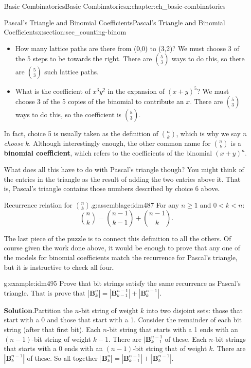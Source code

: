 \documentclass[oneside,10pt,]{book}
\newcommand{\terminology}[1]{\textbf{#1}}
\numberwithin{equation}{chapter}
\def\B{\mathbf{B}}
\newcommand{\lt}{<}
\begin{document}
\begin{chapterptx}{Basic Combinatorics}{}{Basic Combinatorics}{}{}{x:chapter:ch_basic-combinatorics}
\begin{sectionptx}{Pascal's Triangle and Binomial Coefficients}{}{Pascal's Triangle and Binomial Coefficients}{}{}{x:section:sec_counting-binom}
\begin{itemize}[label=\textbullet]
\item{}How many lattice paths are there from (0,0) to (3,2)?  We must choose 3 of the 5 steps to be towards the right.  There are \({5 \choose 3}\) ways to do this, so there are \({5 \choose 3}\) such lattice paths.%
\item{}What is the coefficient of \(x^3y^2\) in the expansion of \((x+y)^5\)?  We must choose 3 of the 5 copies of the binomial to contribute an \(x\).  There are \({5 \choose 3}\) ways to do this, so the coefficient is \({5 \choose 3}\).%
\end{itemize}
%
\par
In fact, choice 5 is usually taken as the definition of \(\binom{n}{k}\), which is why we say \(n\) \emph{choose} \(k\).  Although interestingly enough, the other common name for \(\binom{n}{k}\) is a \terminology{binomial coefficient}, which refers to the coefficients of the binomial \((x+y)^n\).%
\par
What does all this have to do with Pascal's triangle though?  You might think of the entries in the triangle as the result of adding the two entries above it.  That is, Pascal's triangle contains those numbers described by choice 6 above.%
\begin{assemblage}{Recurrence relation for \({n \choose k}\).}{g:assemblage:idm487}%
For any \(n \ge 1\) and \(0 \lt k \lt n\):%
\begin{equation*}
{n \choose k} = {n-1 \choose k-1} + {n-1 \choose k}.
\end{equation*}
%
\end{assemblage}
The last piece of the puzzle is to connect this definition to all the others.  Of course given the work done above, it would be enough to prove that any one of the models for binomial coefficients match the recurrence for Pascal's triangle, but it is instructive to check all four.%
\begin{example}{}{g:example:idm495}%
Prove that bit strings satisfy the same recurrence as Pascal's triangle.  That is prove that \(|\B^n_k| = |\B^{n-1}_{k-1}| + |\B^{n-1}_k|\).%
\par\smallskip%
\noindent\textbf{Solution}.\hypertarget{g:solution:idm499}{}\quad{}Partition the \(n\)-bit string of weight \(k\) into two disjoint sets: those that start with a 0 and those that start with a 1.  Consider the remainder of each bit string (after that first bit). Each \(n\)-bit string that starts with a 1 ends with an \((n-1)\)-bit string of weight \(k-1\).  There are \(|\B^{n-1}_{k-1}\) of these. Each \(n\)-bit strings that starts with a 0 ends with an \((n-1)\)-bit string that of weight \(k\).  There are \(|\B^{n-1}_k|\) of these.  So all together \(|\B^n_k| = |\B^{n-1}_{k-1}| + |\B^{n-1}_k|\).%

\end{example}
\end{sectionptx}
\end{chapterptx}
\end{document}
